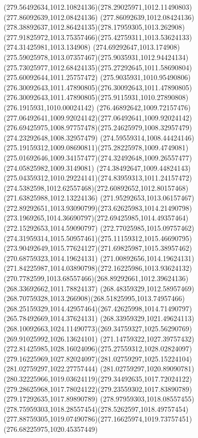 {{		\curveto(279.56492634,1012.10824136)(278.29025971,1012.11490803)(277.86092639,1012.08424136)
		\curveto(277.86092639,1012.08424136)(278.38892637,1012.86424135)(278.17959305,1013.262908)
		\curveto(277.91825972,1013.75357466)(275.42759311,1013.53624133)(274.31425981,1013.134908)
		\curveto(274.69292647,1013.174908)(275.59025978,1013.07357467)(275.9035931,1012.94424134)
		\curveto(275.73025977,1012.68424135)(275.27292645,1011.58690804)(275.60092644,1011.25757472)
		\curveto(275.9035931,1010.95490806)(276.30092643,1011.47890805)(276.30092643,1011.47890805)
		\curveto(276.30092643,1011.47890805)(275.9115931,1010.27890808)(276.1915931,1010.00024142)
		\curveto(276.46892642,1009.72157476)(277.06492641,1009.92024142)(277.06492641,1009.92024142)
		\curveto(276.69425975,1008.97757478)(275.24625979,1008.32957479)(274.23292648,1008.32957479)
		\curveto(274.59559314,1008.44424146)(275.19159312,1009.08690811)(275.28225978,1009.4749081)
		\curveto(275.01692646,1009.34157477)(274.32492648,1009.26557477)(274.05825982,1009.3149081)
		\curveto(274.38492647,1009.44824143)(275.04359312,1010.29224141)(274.83959313,1011.24157472)
		\curveto(274.5382598,1012.62557468)(272.60892652,1012.80157468)(271.63825988,1012.13224136)
		\curveto(271.95292653,1013.06157467)(272.89292651,1013.93090799)(273.62625983,1014.21490798)
		\curveto(273.1969265,1014.36690797)(272.69425985,1014.49357464)(272.15292653,1014.59090797)
		\curveto(272.77025985,1015.09757462)(274.31959314,1015.50957461)(275.11159312,1015.46690795)
		\curveto(273.90492649,1015.77624127)(271.69825987,1015.38957462)(270.68759323,1014.19624131)
		\curveto(271.00892656,1014.19624131)(271.84225987,1014.03890798)(272.16225986,1013.93624132)
		\curveto(270.7782599,1013.68557466)(268.89292661,1012.39624136)(268.33692662,1011.78824137)
		\curveto(268.48359329,1012.58957469)(268.70759328,1013.266908)(268.51825995,1013.74957466)
		\curveto(268.25159329,1014.42957464)(267.42625998,1014.71490797)(265.78492669,1014.37624131)
		\moveto(268.33959329,1021.49624113)
		\curveto(268.10092663,1024.11490773)(269.34759327,1025.56290769)(269.91025992,1026.13624101)
		\curveto(271.14759322,1027.39757432)(272.81425985,1028.16024096)(275.27559312,1028.02824097)
		\curveto(279.16225969,1027.82024097)(281.02759297,1025.15224104)(281.02759297,1022.27757444)
		\curveto(281.02759297,1020.89090781)(280.32225966,1019.03624119)(279.34492635,1017.72024122)
		\curveto(279.28625968,1017.78024122)(279.23559302,1017.83890789)(279.17292635,1017.89890789)
		\curveto(278.97959303,1018.08557455)(278.75959303,1018.28557454)(278.5262597,1018.49757454)
		\curveto(277.88759305,1019.07490786)(277.16625974,1019.73757451)(276.68225975,1020.45357449)
}}
